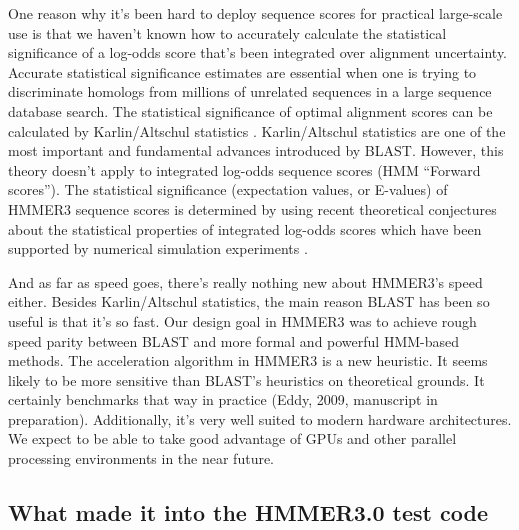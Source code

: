 One reason why it's been hard to deploy sequence scores for practical
large-scale use is that we haven't known how to accurately calculate
the statistical significance of a log-odds score that's been
integrated over alignment uncertainty. Accurate statistical
significance estimates are essential when one is trying to
discriminate homologs from millions of unrelated sequences in a large
sequence database search. The statistical significance of optimal
alignment scores can be calculated by Karlin/Altschul statistics
\citep{Karlin90,KarlinAltschul93}. Karlin/Altschul statistics are one
of the most important and fundamental advances introduced by BLAST.
However, this theory doesn't apply to integrated log-odds sequence
scores (HMM ``Forward scores'').  The statistical significance
(expectation values, or E-values) of HMMER3 sequence scores is
determined by using recent theoretical conjectures about the
statistical properties of integrated log-odds scores which have been
supported by numerical simulation experiments \citep{Eddy08}.

And as far as speed goes, there's really nothing new about HMMER3's
speed either. Besides Karlin/Altschul statistics, the main reason
BLAST has been so useful is that it's so fast.  Our design goal in
HMMER3 was to achieve rough speed parity between BLAST and more formal
and powerful HMM-based methods.  The acceleration algorithm in HMMER3
is a new heuristic. It seems likely to be more sensitive than BLAST's
heuristics on theoretical grounds. It certainly benchmarks that way in
practice (Eddy, 2009, manuscript in preparation). Additionally, it's
very well suited to modern hardware architectures. We expect to be
able to take good advantage of GPUs and other parallel processing
environments in the near future.



\subsection{What made it into the HMMER3.0 test code}

